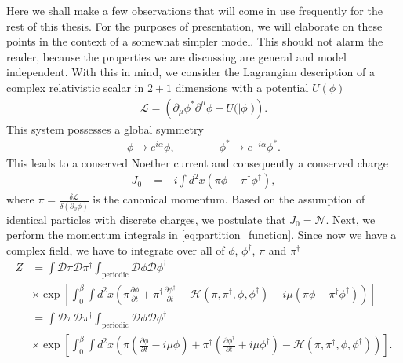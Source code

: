 Here we shall make a few observations that will come in use frequently for the rest of this thesis. For the purposes of presentation, we will elaborate on these points in the context of a somewhat simpler model. This should not alarm the reader, because the properties we are discussing are general and model independent. With this in mind, we consider the Lagrangian description of a complex relativistic scalar in $2+1$ dimensions with a potential $U(\phi)$
        \begin{align}
            \mathcal{L} = \left(\partial_{\mu}\phi^{*} \partial^{\mu} \phi  - U\big(|\phi|\big)\right).
        \end{align}
        This system possesses a global symmetry 
        \begin{align}
            \phi \rightarrow e^{i \alpha} \phi, \qquad\qquad \phi^* \rightarrow e^{-i \alpha} \phi^*.
        \end{align}
        This leads to a conserved Noether current and consequently a conserved charge
        \begin{align}
            J_{0} &= -i \int d^2x \left( \pi \phi - \pi^{\dag}\phi^{\dag}\right),
        \end{align}
        where $\pi = \frac{\delta \mathcal{L}}{\delta ( \partial_0 \phi)}$ is the canonical momentum. Based on the assumption of identical particles with discrete charges, we postulate that $J_0 = \mathcal{N}$. Next, we perform the momentum integrals in \eqref{eq:partition_function}. Since now we have a complex field, we have to integrate over all of $\phi$, $\phi^{\dag}$, $\pi$ and $\pi^{\dag}$
        \begin{align}
            Z &= \int \mathcal{D} \pi \mathcal{D} \pi^{\dag} \int_{\text{periodic}} \mathcal{D} \phi \mathcal{D} \phi^{\dag} \nonumber \\
            &\times \exp \left[ \int_0^{\beta} \int d^2x \left(\pi \frac{\partial \phi}{\partial t} +\pi^{\dag} \frac{\partial \phi^{\dag}}{\partial t} - \mathcal{H}\left(\pi, \pi^{\dag}, \phi, \phi^{\dag}\right) - i  \mu \left(\pi \phi - \pi^{\dag}\phi^{\dag} \right) \right) \right] \label{eq:partition_function_complex_scalar} \nonumber \\
            &= \int \mathcal{D} \pi \mathcal{D} \pi^{\dag} \int_{\text{periodic}} \mathcal{D} \phi \mathcal{D} \phi^{\dag} \nonumber \\
            &\times \exp \left[ \int_0^{\beta} \int d^2x \left(\pi \left( \frac{\partial \phi}{\partial t} -i \mu \phi \right) +\pi^{\dag} \left( \frac{\partial \phi^{\dag}}{\partial t} +i \mu \phi^{\dag} \right) - \mathcal{H}(\pi, \pi^{\dag}, \phi, \phi^{\dag}) \right) \right]. \label{eq:partition_function_complex_scalar}
        \end{align}
